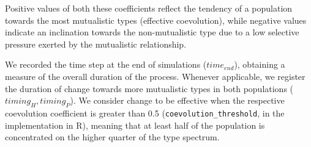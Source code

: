 \documentclass[
]{book}
\begin{document}
Positive values of both these coefficients reflect the tendency of a population towards the most mutualistic types (effective coevolution), while negative values indicate an inclination towards the non-mutualistic type due to a low selective pressure exerted by the mutualistic relationship.

We recorded the time step at the end of simulations (\(time_{end}\)), obtaining a measure of the overall duration of the process. Whenever applicable, we register the duration of change towards more mutualistic types in both populations (\(timing_H, timing_P\)). We consider change to be effective when the respective coevolution coefficient is greater than 0.5 (\texttt{coevolution\_threshold}, in the implementation in R), meaning that at least half of the population is concentrated on the higher quarter of the type spectrum.
\end{document}
